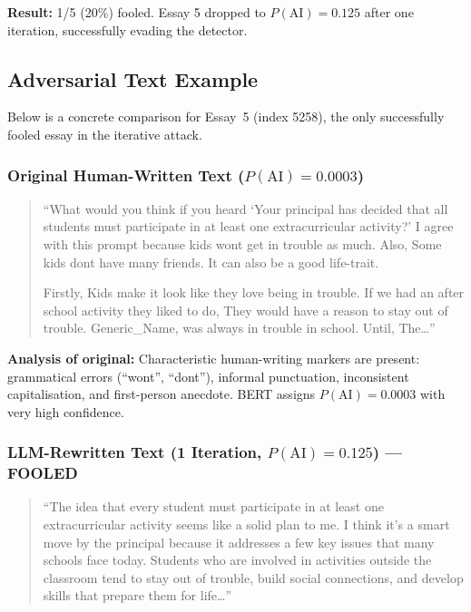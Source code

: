\documentclass[11pt,a4paper]{article}
\begin{document}
\textbf{Result:} 1/5 (20\%) fooled. Essay 5 dropped to $P(\text{AI})=0.125$ after one iteration, successfully evading the detector.

\subsection{Adversarial Text Example}

Below is a concrete comparison for Essay~5 (index 5258), the only successfully fooled essay in the iterative attack.

\subsubsection*{Original Human-Written Text ($P(\text{AI})=0.0003$)}

\begin{quote}
``What would you think if you heard `Your principal has decided that all students must participate in at least one extracurricular activity?' 
I agree with this prompt because kids wont get in trouble as much. Also, Some kids dont have many friends. It can also be a good life-trait.

Firstly, Kids make it look like they love being in trouble. If we had an after school activity they liked to do, They would have a reason to stay out of trouble. Generic\_Name, was always in trouble in school. Until, The\ldots''
\end{quote}

\textbf{Analysis of original:} Characteristic human-writing markers are present: grammatical errors (``wont'', ``dont''), informal punctuation, inconsistent capitalisation, and first-person anecdote. BERT assigns $P(\text{AI})=0.0003$ with very high confidence.

\subsubsection*{LLM-Rewritten Text (1 Iteration, $P(\text{AI})=0.125$) — FOOLED}

\begin{quote}
``The idea that every student must participate in at least one extracurricular activity seems like a solid plan to me. I think it's a smart move by the principal because it addresses a few key issues that many schools face today. Students who are involved in activities outside the classroom tend to stay out of trouble, build social connections, and develop skills that prepare them for life\ldots''
\end{quote}
\end{document}
